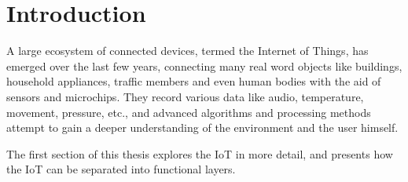


\section{Introduction}
\label{sec:introduction}
A large ecosystem of connected devices, termed the Internet of Things, has emerged over the last few years, connecting many real word objects like buildings, household appliances, traffic members and even human bodies with the aid of sensors and microchips.
They record various data like audio, temperature, movement, pressure, etc., and advanced algorithms and processing methods attempt to gain a deeper understanding of the environment and the user himself.

The first section of this thesis explores the IoT in more detail, and presents how the IoT can be separated into functional layers.

